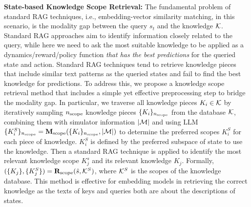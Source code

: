 \textbf{State-based Knowledge Scope Retrieval:}\label{sec:sbksr} 
The fundamental problem of standard RAG techniques, i.e., embedding-vector similarity matching, in this scenario, is the modality gap between the query $s_t$ and the knowledge $\mathcal{K}$.
Standard RAG approaches aim to identify information closely related to the query, while here we need to ask the most suitable knowledge to be applied as a dynamics/reward/policy function \textit{that has the best predictions} for the queried state and action. Standard RAG techniques tend to retrieve knowledge pieces that include similar text patterns as the queried states and fail to find the best knowledge for predictions. To address this, we propose a knowledge scope retrieval method that includes a simple yet effective preprocessing step to bridge the modality gap. In particular, we traverse all knowledge pieces $K_i \in \mathcal{K}$ by iteratively sampling $n_{\rm scope}$ knowledge pieces $\{K_i\}_{n_{\rm scope}}$ from the database $\mathcal{K}$, combining them with simulator information $|{\mathcal{M}}|$ and using LLM $\{K^S_i\}_{n_{\rm scope}}=\mathbf{M}_{\rm scope}(\{K_i\}_{n_{\rm scope}},|{\mathcal{M}}|)$ to determine the preferred scopes $K^S_i$ for each piece of knowledge. 
$K^S_i$ is defined by the preferred subspace of state to use the knowledge. Then a standard RAG technique is applied to identify the most relevant knowledge scope $K^s_j$ and its relevant knowledge $K_j$. Formally, $(\{K_j\}, \{K^S_j\})=\mathbf{R}_{\rm scope}(\hat s, \mathcal{K}^{S})$, where $\mathcal{K}^{S}$ is the scopes of the knowledge database. This method is effective for embedding models in retrieving the correct knowledge as the texts of keys and queries both are about the descriptions of states. 



